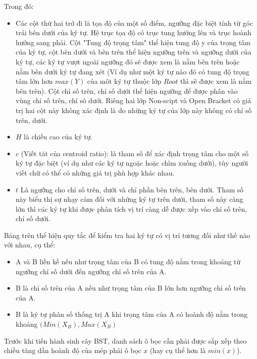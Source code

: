 \documentclass[a4paper,12pt]{article}
\begin{document}
	Trong đó:
	\begin{itemize}
		\item Các cột thứ hai trở đi là tọa độ của một số điểm, ngưỡng đặc biệt tính từ góc trái bên dưới của ký tự. Hệ trục tọa độ có trục tung hướng lên và trục hoành hướng sang phải. Cột "Tung độ trọng tâm" thể hiện tung độ y của trọng tâm của ký tự, cột bên dưới và bên trên thể hiện ngưỡng trên và ngưỡng dưới của ký tự, các ký tự vượt ngoài ngưỡng đó sẽ được xem là nằm bên trên hoặc nằm bên dưới ký tự đang xét (Ví dụ như một ký tự nào đó có tung độ trọng tâm lớn hơn $max(Y)$ của môt ký tự thuộc lớp $Root$ thì sẽ được xem là nằm bên trên). Cột chỉ số trên, chỉ số dưới thể hiện ngưỡng để được phân vào vùng chỉ số trên, chỉ sô dưới. Riêng hai lớp Non-scipt và Open Bracket có giá trị hai cột này không xác định là do những ký tự của lớp này không có chỉ số trên, dưới.
		\item $H$ là chiều cao của ký tự.
		\item $c$ (Viết tăt của centroid ratio): là tham số để xác định trọng tâm cho một số ký tự đặc biệt (ví dụ như các ký tự ngoặc hoặc chìm xuống dưới), tùy người viết chữ có thể có những giá trị phù hợp khác nhau.
		\item $t$ Là ngưỡng cho chỉ số trên, dưới và chỉ phần bên trên, bên dưới. Tham số này biểu thị sự nhạy cảm đối với những ký tự trên dưới, tham số này càng lớn thì các ký tự khi được phân tích vị trí càng dễ được xếp vào chỉ số trên, chỉ số dưới.
	\end{itemize}
	
	Bảng trên thể hiện quy tắc để kiểm tra hai ký tự có vị trí tương đối như thế nào với nhau, cụ thể:
	\begin{itemize}
		\item A và B liền kề nếu như trọng tâm của B có tung độ nằm trong khoảng từ ngưỡng chỉ số dưới đến ngưỡng chỉ số trên của A.
		\item B là chỉ số trên của A nếu như trọng tâm của B lớn hơn ngưỡng chỉ số trên của A.
		
		\item B là ký tự phân số thống trị A khi trọng tâm của A có hoành độ nằm trong khoảng $(Min(X_B), Max(X_B)$
	
	\end{itemize}
	
	Trước khi tiến hành sinh cây BST, danh sách ô bọc cần phải được sắp xếp theo chiều tăng dần hoành độ của mép phải ô bọc $x$ (hay cụ thể hơn là $min(x)$). \\
	
\end{document}
